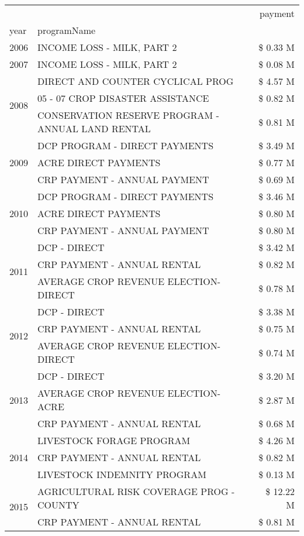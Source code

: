 \begin{tabular}{llr}
\toprule
 &  & payment \\
year & programName &  \\
\midrule
2006 & INCOME LOSS - MILK, PART 2 & \$ 0.33 M \\
\cline{1-3}
2007 & INCOME LOSS - MILK, PART 2 & \$ 0.08 M \\
\cline{1-3}
\multirow[t]{3}{*}{2008} & DIRECT AND COUNTER CYCLICAL PROG & \$ 4.57 M \\
 & 05 - 07 CROP DISASTER ASSISTANCE & \$ 0.82 M \\
 & CONSERVATION RESERVE PROGRAM - ANNUAL LAND RENTAL & \$ 0.81 M \\
\cline{1-3}
\multirow[t]{3}{*}{2009} & DCP PROGRAM - DIRECT PAYMENTS & \$ 3.49 M \\
 & ACRE DIRECT PAYMENTS & \$ 0.77 M \\
 & CRP PAYMENT - ANNUAL PAYMENT & \$ 0.69 M \\
\cline{1-3}
\multirow[t]{3}{*}{2010} & DCP PROGRAM - DIRECT PAYMENTS & \$ 3.46 M \\
 & ACRE DIRECT PAYMENTS & \$ 0.80 M \\
 & CRP PAYMENT - ANNUAL PAYMENT & \$ 0.80 M \\
\cline{1-3}
\multirow[t]{3}{*}{2011} & DCP - DIRECT & \$ 3.42 M \\
 & CRP PAYMENT - ANNUAL RENTAL & \$ 0.82 M \\
 & AVERAGE CROP REVENUE ELECTION-DIRECT & \$ 0.78 M \\
\cline{1-3}
\multirow[t]{3}{*}{2012} & DCP - DIRECT & \$ 3.38 M \\
 & CRP PAYMENT - ANNUAL RENTAL & \$ 0.75 M \\
 & AVERAGE CROP REVENUE ELECTION-DIRECT & \$ 0.74 M \\
\cline{1-3}
\multirow[t]{3}{*}{2013} & DCP - DIRECT & \$ 3.20 M \\
 & AVERAGE CROP REVENUE ELECTION-ACRE & \$ 2.87 M \\
 & CRP PAYMENT - ANNUAL RENTAL & \$ 0.68 M \\
\cline{1-3}
\multirow[t]{3}{*}{2014} & LIVESTOCK FORAGE PROGRAM & \$ 4.26 M \\
 & CRP PAYMENT - ANNUAL RENTAL & \$ 0.82 M \\
 & LIVESTOCK INDEMNITY PROGRAM & \$ 0.13 M \\
\cline{1-3}
\multirow[t]{3}{*}{2015} & AGRICULTURAL RISK COVERAGE PROG - COUNTY & \$ 12.22 M \\
 & CRP PAYMENT - ANNUAL RENTAL & \$ 0.81 M \\

\end{tabular}
